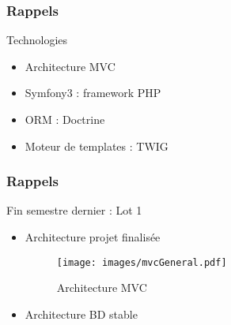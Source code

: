 \speaker{\Francois}

\begin{frame}
\frametitle{Rappels}
\begin{block}{Technologies}
	\begin{itemize}
		\item Architecture MVC
		\item Symfony3 : framework PHP
		\item ORM : Doctrine
		\item Moteur de templates : TWIG
	\end{itemize}
\end{block}
\end{frame}

\begin{frame}
\frametitle{Rappels}
\begin{block}{Fin semestre dernier : Lot 1}
	\begin{itemize}
		\item Architecture projet finalisée
		\begin{figure}[!h]
			\begin{center}
				\texttt{[image: images/mvcGeneral.pdf]}
				\caption{Architecture MVC}
			\end{center}
		\end{figure}
		\item Architecture BD stable
	\end{itemize}
\end{block}
\end{frame}